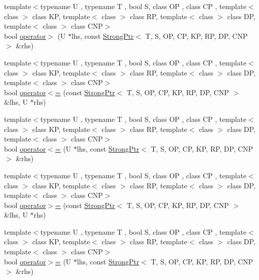 \begin{DoxyCompactItemize}
\item 
{\footnotesize template$<$typename U , typename T , bool S, class O\+P , class C\+P , template$<$ class $>$ class K\+P, template$<$ class $>$ class R\+P, template$<$ class $>$ class D\+P, template$<$ class $>$ class C\+N\+P$>$ }\\bool \hyperlink{group__SmartPointerGroup_ga2e66dcb340f8be20d59c0bc25e31f847}{operator$>$} (U $\ast$lhs, const \hyperlink{classLoki_1_1StrongPtr}{Strong\+Ptr}$<$ T, S, O\+P, C\+P, K\+P, R\+P, D\+P, C\+N\+P $>$ \&rhs)
\item 
{\footnotesize template$<$typename U , typename T , bool S, class O\+P , class C\+P , template$<$ class $>$ class K\+P, template$<$ class $>$ class R\+P, template$<$ class $>$ class D\+P, template$<$ class $>$ class C\+N\+P$>$ }\\bool \hyperlink{group__SmartPointerGroup_ga1349a2ef1d4d18e0d825d1a22299c585}{operator$<$=} (const \hyperlink{classLoki_1_1StrongPtr}{Strong\+Ptr}$<$ T, S, O\+P, C\+P, K\+P, R\+P, D\+P, C\+N\+P $>$ \&lhs, U $\ast$rhs)
\item 
{\footnotesize template$<$typename U , typename T , bool S, class O\+P , class C\+P , template$<$ class $>$ class K\+P, template$<$ class $>$ class R\+P, template$<$ class $>$ class D\+P, template$<$ class $>$ class C\+N\+P$>$ }\\bool \hyperlink{group__SmartPointerGroup_ga79f9bc3cba5be737713e01278836071b}{operator$<$=} (U $\ast$lhs, const \hyperlink{classLoki_1_1StrongPtr}{Strong\+Ptr}$<$ T, S, O\+P, C\+P, K\+P, R\+P, D\+P, C\+N\+P $>$ \&rhs)
\item 
{\footnotesize template$<$typename U , typename T , bool S, class O\+P , class C\+P , template$<$ class $>$ class K\+P, template$<$ class $>$ class R\+P, template$<$ class $>$ class D\+P, template$<$ class $>$ class C\+N\+P$>$ }\\bool \hyperlink{group__SmartPointerGroup_gafff630dad25f2390bfddba4e494c18e1}{operator$>$=} (const \hyperlink{classLoki_1_1StrongPtr}{Strong\+Ptr}$<$ T, S, O\+P, C\+P, K\+P, R\+P, D\+P, C\+N\+P $>$ \&lhs, U $\ast$rhs)
\item 
{\footnotesize template$<$typename U , typename T , bool S, class O\+P , class C\+P , template$<$ class $>$ class K\+P, template$<$ class $>$ class R\+P, template$<$ class $>$ class D\+P, template$<$ class $>$ class C\+N\+P$>$ }\\bool \hyperlink{group__SmartPointerGroup_gaadaa4698c496d593d62e877aadf02580}{operator$>$=} (U $\ast$lhs, const \hyperlink{classLoki_1_1StrongPtr}{Strong\+Ptr}$<$ T, S, O\+P, C\+P, K\+P, R\+P, D\+P, C\+N\+P $>$ \&rhs)

\end{DoxyCompactItemize}
